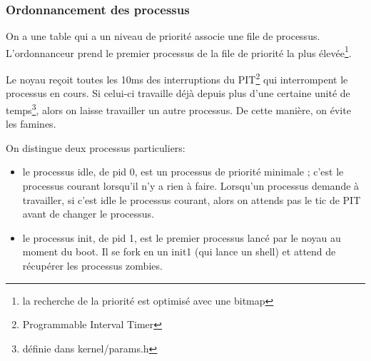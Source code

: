 \documentclass[10pt,a4paper]{beamer}
\begin{document}
\begin{frame}
  \frametitle{Ordonnancement des processus}
  On a une table qui a un niveau de priorité associe une file de processus. L'ordonnanceur prend le premier processus de la file de priorité la plus élevée\footnote{la recherche de la priorité est optimisé avec une bitmap}.

  Le noyau reçoit toutes les 10ms des interruptions du PIT\footnote{Programmable Interval Timer} qui interrompent le processus en cours. Si celui-ci travaille déjà depuis plus d'une certaine unité de temps\footnote{définie dans kernel/params.h}, alors on laisse travailler un autre processus. De cette manière, on évite les famines.

  On distingue deux processus particuliers:
  \begin{itemize}
  \item le processus \textrm{idle}, de pid 0, est un processus de priorité minimale ; c'est le processus courant lorsqu'il n'y a rien à faire. Lorsqu'un processus demande à travailler, si c'est \textrm{idle} le processus courant, alors on attends pas le tic de PIT avant de changer le processus.
  \item le processus \textrm{init}, de pid 1, est le premier processus lancé par le noyau au moment du boot. Il se fork en un \textrm{init1} (qui lance un shell) et attend de récupérer les processus zombies.
  \end{itemize}

\end{frame}
\end{document}
